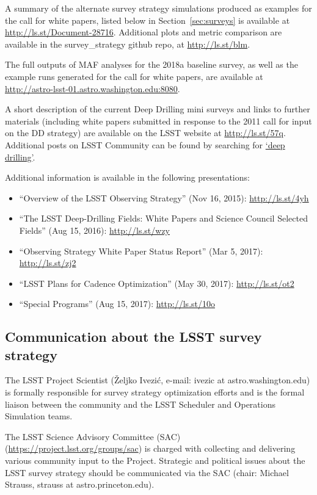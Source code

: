 \documentclass[DM,toc,usenatbib]{lsstdoc}
\begin{document}
A summary of the alternate survey strategy simulations produced as examples for the call for white papers, listed below in Section~\ref{sec:surveys}
is available at \url{http://ls.st/Document-28716}. Additional plots and metric comparison are available in the survey\_strategy github repo, at \url{http://ls.st/blm}.

The full outputs of MAF analyses for the 2018a baseline survey, as well as the example runs generated for the call for white papers, are available at \url{http://astro-lsst-01.astro.washington.edu:8080}.  

A short description of the current Deep Drilling mini surveys and links to further materials (including white papers submitted in response to the 2011 call for input on the DD strategy) are available on the LSST website at \href{https://www.lsst.org/scientists/survey-design/ddf}{http://ls.st/57q}. Additional posts on LSST Community can be found by searching for \href{https://community.lsst.org/search?q=deep%20drilling}{`deep drilling'}. 

Additional information is available in the following presentations:
\begin{itemize}
\item ``Overview of the LSST Observing Strategy'' (Nov 16, 2015): \url{http://ls.st/4yh}
\item ``The LSST Deep-Drilling Fields: White Papers and Science Council Selected Fields'' (Aug 15, 2016): \url{http://ls.st/wzy}
\item ``Observing Strategy White Paper Status Report'' (Mar 5, 2017): \url{http://ls.st/zj2}
\item ``LSST Plans for Cadence Optimization'' (May 30, 2017): \url{http://ls.st/ot2}
\item ``Special Programs'' (Aug 15, 2017): \url{http://ls.st/10o}
\end{itemize}


\subsection{Communication about the LSST survey strategy} 

The LSST Project Scientist (\v{Z}eljko Ivezi\'{c}, e-mail: ivezic at astro.washington.edu) is formally responsible for survey strategy optimization efforts and is the formal liaison between the community and the LSST Scheduler and Operations Simulation teams.

The LSST Science Advisory Committee (SAC) (\url{https://project.lsst.org/groups/sac}) is charged with collecting and delivering various community input to the Project. Strategic and political issues about the LSST survey strategy should be communicated via the SAC (chair: Michael Strauss, strauss at astro.princeton.edu).
\end{document}
